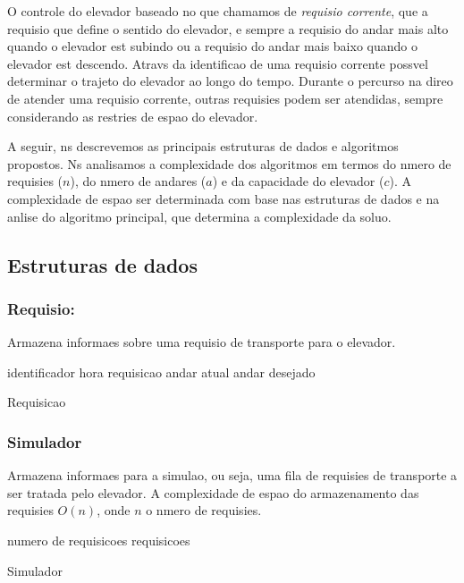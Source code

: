 \documentclass[12pt]{article}
\begin{document}
O controle do elevador  baseado no que chamamos de \textit{requisio corrente}, que  a requisio 
que define o sentido do elevador, e  sempre a requisio do andar mais alto quando o elevador est 
subindo ou a requisio do andar mais baixo quando o elevador est descendo. Atravs da identificao 
de uma requisio corrente  possvel determinar o trajeto do elevador ao longo do tempo. Durante o 
percurso na direo de atender uma requisio corrente, outras requisies podem ser atendidas, sempre 
considerando as restries de espao do elevador.

A seguir, ns descrevemos as principais estruturas de dados e algoritmos propostos. Ns analisamos 
a complexidade dos algoritmos em termos do nmero de requisies ($n$), do nmero de andares ($a$) e 
da capacidade do elevador ($c$). A complexidade de espao ser determinada com base nas estruturas 
de dados e na anlise do algoritmo principal, que determina a complexidade da soluo.

\subsection{Estruturas de dados}

\subsubsection{Requisio:}

Armazena informaes sobre uma requisio de transporte para o elevador.
\begin{algorithm}[h!]
\begin{footnotesize}

	identificador\;
	hora requisicao\;
	andar atual\;
	andar desejado\;

\caption{Requisicao}%
\end{footnotesize}
\end{algorithm}

\subsubsection{Simulador}

Armazena informaes para a simulao, ou seja, uma fila de requisies de transporte a ser tratada pelo elevador. A complexidade de espao do armazenamento das requisies  $O(n)$, onde $n$  o nmero de requisies.
\begin{algorithm}[h!]
\begin{footnotesize}
	numero de requisicoes\;
	requisicoes\;

\caption{Simulador}%
\end{footnotesize}
\end{algorithm}
\end{document}
